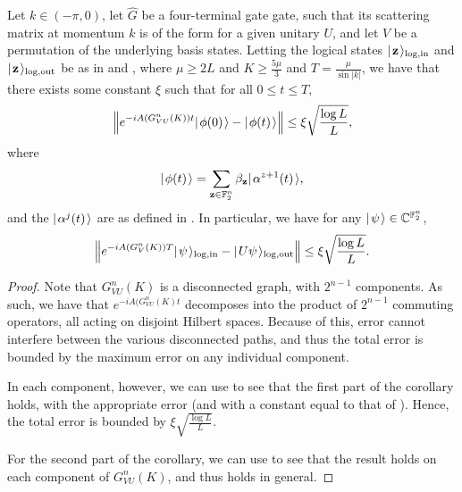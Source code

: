 \documentclass[../thesis-main/thesis-main]{subfiles}
\begin{document}
\begin{corollary}
\label{cor:multi_qubit_single_gate_encoded_computation}
  Let $k\in (-\pi,0)$, let $\widehat{G}$ be a four-terminal gate gate, such that its scattering matrix at momentum $k$ is of the form  for a given unitary $U$, and let $V$ be a permutation of the underlying basis states.  Letting the logical states $|\mspace{2mu} \mathbf{z} \mspace{2mu} \rangle_{\text{log},\text{in}}$ and $|\mspace{2mu} \mathbf{z} \mspace{2mu} \rangle_{\text{log},\text{out}}$ be as in  and , where $\mu \geq 2L$ and $K \geq \frac{5\mu}{3}$ and $T = \frac{\mu}{\sin |k|}$, we have that there exists some constant $\xi$ such that for all $0 \leq t \leq T$, 
\begin{align}
  \Big\Vert e^{-i A(G_{VU}^n(K))t} |\mspace{2mu} \phi(0) \mspace{2mu} \rangle - |\mspace{2mu} \phi(t) \mspace{2mu} \rangle \Big\Vert \leq \xi \sqrt{\frac{\log L}{L}},
\end{align}
where
\begin{align}
  |\mspace{2mu} \phi(t) \mspace{2mu} \rangle = \sum_{\mathbf{z}\in \mathbb{F}_2^n} \beta_{\mathbf{z}} |\mspace{2mu} \alpha^{z+1}(t) \mspace{2mu} \rangle,
\end{align}
and the $|\mspace{2mu} \alpha^j(t) \mspace{2mu} \rangle$ are as defined in .  In particular, we have for any $|\mspace{2mu} \psi \mspace{2mu} \rangle\in \mathbb{C}^{\mathbb{F}_2^n}$,
\begin{align}
  \Big\Vert e^{-i A(G_V^n(K)) T} |\mspace{2mu} \psi \mspace{2mu} \rangle_{\text{log},\text{in}} - |\mspace{2mu} U\psi \mspace{2mu} \rangle_{\text{log},\text{out}} \Big\Vert \leq \xi \sqrt{\frac{\log L}{L}}.
\end{align}
\end{corollary}
\begin{proof}
  Note that $G_{VU}^n(K)$ is a disconnected graph, with $2^{n-1}$ components.  As such, we have that $e^{-i A(G_{VU}^n(K)t}$ decomposes into the product of $2^{n-1}$ commuting operators, all acting on disjoint Hilbert spaces.  Because of this, error cannot interfere between the various disconnected paths, and thus the total error is bounded by the maximum error on any individual component.
  
  In each component, however, we can use  to see that the first part of the corollary holds, with the appropriate error (and with a constant equal to that of ).  Hence, the total error is bounded by $\xi \sqrt{\frac{\log L}{L}}$.
  
  For the second part of the corollary, we can use  to see that the result holds on each component of $G_{VU}^n(K)$, and thus holds in general.
\end{proof}
\end{document}
